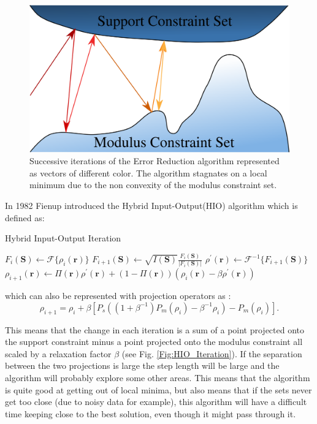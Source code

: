\begin{figure}[h]
\centering
  \includegraphics[width=0.8 \columnwidth]{Image_Reconstruction/Stagnation.png}
  \caption{Successive iterations of the Error Reduction algorithm represented as
    vectors of different color. The algorithm stagnates on a local minimum due
    to the non convexity of the modulus constraint set.}
  \label{Fig:Stagnation}
\end{figure}

In 1982 Fienup introduced the Hybrid Input-Output(HIO) algorithm \cite{Fienup1982Phase}
which is defined as:
\begin{algorithm}
\caption{Hybrid Input-Output Iteration}
\begin{algorithmic}
  \STATE $F_{i}(\mathbf S) \gets \mathscr{F}\{\rho_i(\mathbf r)\}$
  \STATE $F_{i+1}(\mathbf S) \gets \sqrt{I(\mathbf S)} \frac{F_i(\mathbf
    S)}{|F_i(\mathbf S)|}$
  \STATE $\rho^{\prime}(\mathbf r) \gets \mathscr{F}^{-1}\{F_{i+1}(\mathbf S)\}$
  \STATE $\rho_{i+1}(\mathbf r) \gets \Pi(\mathbf r) \rho^{\prime}(\mathbf r) +
  (1-\Pi(\mathbf r)) (\rho_i(\mathbf r)-\beta \rho^{\prime}(\mathbf r))$
\end{algorithmic}
\end{algorithm}

which can also be represented with projection operators as \cite{Thibault2007Algorithmic}:
\begin{equation}
  \rho_{i+1} = \rho_{i} + \beta\left[P_s((1+\beta^{-1})P_m(\rho_i)-\beta^{-1}
    \rho_{i}) -P_m(\rho_i)\right] .
\end{equation}

This means that the change in each iteration is a sum of a point projected onto the
support constraint minus a point projected onto the modulus constraint all
scaled by a relaxation factor $\beta$ (see Fig. \ref{Fig:HIO_Iteration}). If the
separation between the two 
projections is large the step length will be large and the algorithm will
probably explore some other areas. This means that the algorithm is quite good
at getting out of local minima, but also means that if the sets never get too
close (due to noisy data for example), this algorithm will have a difficult time
keeping close to the best solution, even though it might pass through it.

